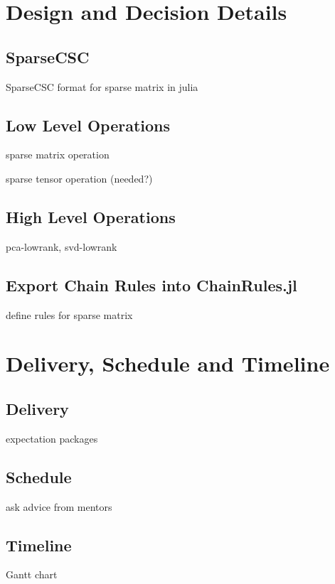 \section{Design and Decision Details}

\subsection{SparseCSC}
SparseCSC format for sparse matrix in julia

\subsection{Low Level Operations}
sparse matrix operation  

sparse tensor operation (needed?)

\subsection{High Level Operations}
pca-lowrank, svd-lowrank

\subsection{Export Chain Rules into ChainRules.jl}
define rules for sparse matrix

\section{Delivery, Schedule and Timeline}

\subsection{Delivery}
expectation packages

\subsection{Schedule}
ask advice from mentors

\subsection{Timeline}
 Gantt chart \cite{gantt1910work}
\vspace{0.5cm}




